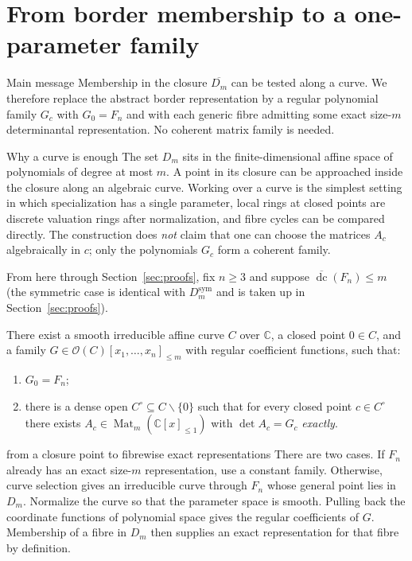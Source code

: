 \documentclass[acmsmall,screen,nonacm]{acmart}
\theoremstyle{definition}
\theoremstyle{remark}
\DeclareMathOperator{\dc}{dc}
\DeclareMathOperator{\Mat}{Mat}
\newcommand{\CC}{\mathbb{C}}
\newcommand{\OO}{\mathcal{O}}
\newcommand{\dcb}{\overline{\dc}}
\begin{document}
\section{From border membership to a one-parameter family}\label{sec:normalform}

\begin{readerbox}{Main message}
Membership in the closure $\overline{D_m}$ can be tested along a curve.  We therefore replace the abstract border representation by a regular polynomial family $G_c$ with $G_0=F_n$ and with each generic fibre admitting some exact size-$m$ determinantal representation.  No coherent matrix family is needed.
\end{readerbox}

\begin{detailbox}{Why a curve is enough}
The set $D_m$ sits in the finite-dimensional affine space of polynomials of
degree at most $m$.  A point in its closure can be approached inside the
closure along an algebraic curve.  Working over a curve is the simplest
setting in which specialization has a single parameter, local rings at closed
points are discrete valuation rings after normalization, and fibre cycles can
be compared directly.  The construction does \emph{not} claim that one can
choose the matrices $A_c$ algebraically in $c$; only the polynomials $G_c$
form a coherent family.
\end{detailbox}

From here through Section~\ref{sec:proofs}, fix $n\ge3$ and suppose
$\dcb(F_n)\le m$ (the symmetric case is identical with
$D_m^{\mathrm{sym}}$ and is taken up in Section~\ref{sec:proofs}).

\begin{lemma}
\label{lem:normalform}
There exist a smooth irreducible affine curve $C$ over $\CC$, a closed
point $0\in C$, and a family
$G\in\OO(C)[x_1,\dots,x_n]_{\le m}$ with regular coefficient
functions, such that:
\begin{enumerate}[label=(\alph*),leftmargin=2.2em]
\item $G_0=F_n$;
\item there is a dense open $C^\circ\subseteq C\smallsetminus\{0\}$
such that for every closed point $c\in C^\circ$ there exists
$A_c\in\Mat_m(\CC[x]_{\le1})$ with $\det A_c=G_c$ \emph{exactly}.
\end{enumerate}
\end{lemma}

\begin{roadmapbox}{from a closure point to fibrewise exact representations}
There are two cases.  If $F_n$ already has an exact size-$m$
representation, use a constant family.  Otherwise, curve selection gives an
irreducible curve through $F_n$ whose general point lies in $D_m$.  Normalize
the curve so that the parameter space is smooth.  Pulling back the coordinate
functions of polynomial space gives the regular coefficients of $G$.
Membership of a fibre in $D_m$ then supplies an exact representation for that
fibre by definition.
\end{roadmapbox}
\end{document}
